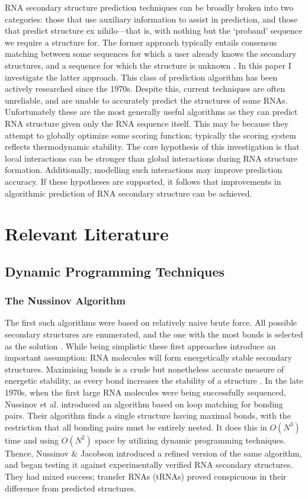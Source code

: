 \documentclass{cshonours}
\begin{document}
RNA secondary structure prediction techniques can be broadly broken into two categories: those that use auxiliary information to assist in prediction, and those that predict structure ex nihilo---that is, with nothing but the `proband' sequence we require a structure for. The former approach typically entails consensus matching between some sequences for which a user already knows the secondary structures, and a sequence for which the structure is unknown \cite{hofacker2008rna}. In this paper I investigate the latter approach. This class of prediction algorithm has been actively researched since the 1970s. Despite this, current techniques are often unreliable, and are unable to accurately predict the structures of some RNAs. Unfortunately these are the most generally useful algorithms as they can predict RNA structure given only the RNA sequence itself. This may be because they attempt to globally optimize some scoring function; typically the scoring system reflects thermodynamic stability. The core hypothesis of this investigation is that local interactions can be stronger than global interactions during RNA structure formation. Additionally, modelling such interactions may improve prediction accuracy. If these hypotheses are supported, it follows that improvements in algorithmic prediction of RNA secondary structure can be achieved.


\chapter{Relevant Literature}
\section{Dynamic Programming Techniques}
\subsection{The Nussinov Algorithm}
The first such algorithms were based on relatively naive brute force. All possible secondary structures are enumerated, and the one with
the most bonds is selected as the solution \cite{nussinov1978algorithms}. While being simplistic
these first approaches introduce an important assumption: RNA molecules will
form energetically stable secondary structures. Maximising bonds is a crude but
nonetheless accurate measure of energetic stability, as every bond increases the
stability of a structure \cite{nussinov1978algorithms}. In the late 1970s, when the first large RNA molecules
were being successfully sequenced, Nussinov et al. \cite{nussinov1978algorithms} introduced an algorithm
based on loop matching for bonding pairs. Their algorithm finds a
single structure having maximal bonds, with the restriction that all bonding pairs must be entirely nested. It does this in $O(N^3)$ time and using $O(N^2)$ space by utilizing dynamic programming techniques. Thence, Nussinov \& Jacobson \cite{nussinov1980fast} introduced
a refined version of the same algorithm, and began testing it against experimentally verified RNA secondary structures. They had mixed success; transfer RNAs
(tRNAs) proved conspicuous in their difference from predicted structures.
\end{document}
